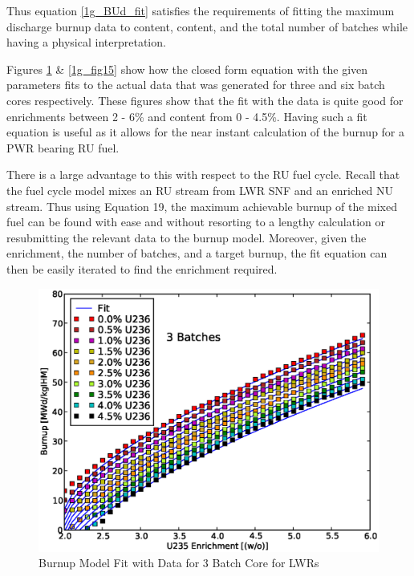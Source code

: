 Thus equation \ref{1g_BUd_fit} satisfies the requirements of fitting the maximum discharge burnup data to 
 content,  content, and the total number of batches while having a physical 
interpretation.  

Figures \ref{1g_fig14} \& \ref{1g_fig15} show how the closed form equation with the given parameters 
fits to the actual data that was generated for three and six batch cores respectively.  These figures 
show that the fit with the data is quite good for  enrichments between 2 - 6\% and 
 content from 0 - 4.5\%.   Having such a fit equation is useful as it allows for the near 
instant calculation of the burnup for a PWR bearing RU fuel.  

There is a large advantage to this with respect to the RU fuel cycle.  Recall that the fuel cycle model 
mixes an RU stream from LWR SNF and an enriched NU stream.  Thus using Equation 19, the maximum achievable 
burnup of the mixed fuel can be found with ease and without resorting to a lengthy calculation or 
resubmitting the relevant data to the burnup model.  Moreover, given the  enrichment, the number 
of batches, and a target burnup, the fit equation can then be easily iterated to find the  enrichment 
required.  

\begin{figure}[htbp]
\caption{Burnup Model Fit with Data for 3 Batch Core for LWRs}
\label{1g_fig14}
\begin{center}
\includegraphics[scale=0.5]{one_group_method/figs/Fig14.eps}
\end{center}
\end{figure}

